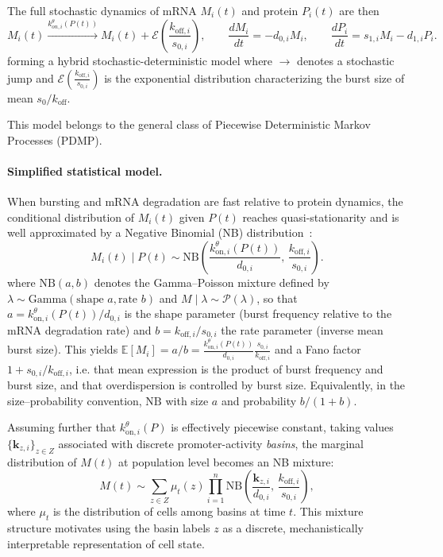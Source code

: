 \documentclass[a4paper, 11pt]{article}
\theoremstyle{plain}
\theoremstyle{remark}
\newcommand*{\firstreview}[1]{{\color{black}#1}}
\begin{document}
The full stochastic dynamics of mRNA $M_i(t)$ and protein $P_i(t)$ are then
\begin{equation}
\label{eq:full_model}
M_i(t) \xrightarrow{k_{on,i}^{\theta}(P(t))} M_i(t) + \mathcal{E}\!\left(\frac{k_{\mathrm{off}, i}}{s_{0, i}}\right), 
\qquad
\frac{dM_i}{dt} = - d_{0,i} M_i,
\qquad 
\frac{dP_i}{dt} = s_{1,i} M_i - d_{1,i} P_i.
\end{equation}
\firstreview{forming a hybrid stochastic-deterministic model where $\xrightarrow{}$ denotes a stochastic jump and $\mathcal{E}\!\left(\frac{k_{\mathrm{off}, i}}{s_{0, i}}\right)$ is the exponential distribution characterizing the burst size of mean $s_0/k_{\mathrm{off}}$.}

\firstreview{This model belongs to the general class of Piecewise Deterministic Markov Processes (PDMP).}

\paragraph{Simplified statistical model.}
When bursting and mRNA degradation are fast relative to protein dynamics, the conditional distribution of $M_i(t)$ given $P(t)$ reaches quasi-stationarity and is well approximated by a Negative Binomial (NB) distribution\firstreview{~\cite{zong2010lysogen, grun_validation_2014, herbach2018modelisation}}:
\begin{equation}
\label{eq:beta_qs}
M_i(t)\mid P(t)
 \sim \mathrm{NB}\!\left(
     \frac{k^{\theta}_{\mathrm{on},i}(P(t))}{d_{0,i}},\,
     \frac{k_{\mathrm{off},i}}{s_{0,i}}
   \right).
\end{equation}
\firstreview{where $\mathrm{NB}(a,b)$ denotes the Gamma--Poisson mixture defined by
$\lambda \sim \mathrm{Gamma}(\text{shape } a, \text{rate } b)$ and $M \mid \lambda \sim
\mathcal{P}(\lambda)$, so that $a = k^{\theta}_{\mathrm{on},i}(P(t))/d_{0,i}$ is the shape
parameter (burst frequency relative to the mRNA degradation rate) and
$b = k_{\mathrm{off},i}/s_{0,i}$ the rate parameter (inverse mean burst size). This yields
$\mathbb{E}[M_i] = a/b = \frac{k^{\theta}_{\mathrm{on},i}(P(t))}{d_{0,i}}\frac{s_{0,i}}{k_{\mathrm{off},i}}$
and a Fano factor $1 + s_{0,i}/k_{\mathrm{off},i}$, i.e. that mean expression
is the product of burst frequency and burst size, and that overdispersion is controlled by burst
size. Equivalently, in the size--probability convention, $\mathrm{NB}$ with size $a$ and
probability $b/(1+b)$.}

Assuming further that $k^{\theta}_{\mathrm{on},i}(P)$ is effectively piecewise constant, taking values $\{\mathbf{k}_{z,i}\}_{z\in Z}$ associated with discrete promoter-activity \emph{basins}, the marginal distribution of $M(t)$ at population level becomes an NB mixture:
\begin{equation}
\label{eq:beta_mixture}
M(t) \sim \sum_{z\in Z} \mu_t(z)
         \prod_{i=1}^n 
         \mathrm{NB}\!\left(
           \frac{\mathbf{k}_{z,i}}{d_{0,i}},\, 
           \frac{k_{\mathrm{off},i}}{s_{0,i}}
         \right),
\end{equation}
where $\mu_t$ is the distribution of cells among basins at time $t$. This mixture structure motivates using the basin labels $z$ as a discrete, mechanistically interpretable representation of cell state.
\end{document}
